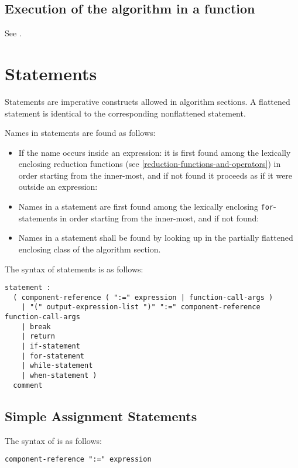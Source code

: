 \subsection{Execution of the algorithm in a function}\label{execution-of-the-algorithm-in-a-function}

See .

\section{Statements}\label{statements}

Statements are imperative constructs allowed in algorithm sections. A
flattened statement is identical to the corresponding nonflattened
statement.

Names in statements are found as follows:
\begin{itemize}
\item
  If the name occurs inside an expression: it is first found among the
  lexically enclosing reduction functions (see \cref{reduction-functions-and-operators}) in order
  starting from the inner-most, and if not found it proceeds as if it
  were outside an expression:
\item
  Names in a statement are first found among the lexically enclosing \lstinline!for!-statements in order starting from the inner-most, and if not found:
\item
  Names in a statement shall be found by looking up in the partially
  flattened enclosing class of the algorithm section.
\end{itemize}

The syntax of statements is as follows:
\begin{lstlisting}[language=grammar]
statement :
  ( component-reference ( ":=" expression | function-call-args )
    | "(" output-expression-list ")" ":=" component-reference function-call-args
    | break
    | return
    | if-statement
    | for-statement
    | while-statement
    | when-statement )
  comment
\end{lstlisting}

\subsection{Simple Assignment Statements}\label{simple-assignment-statements}

The syntax of  is as follows:
\begin{lstlisting}[language=grammar]
component-reference ":=" expression
\end{lstlisting}

